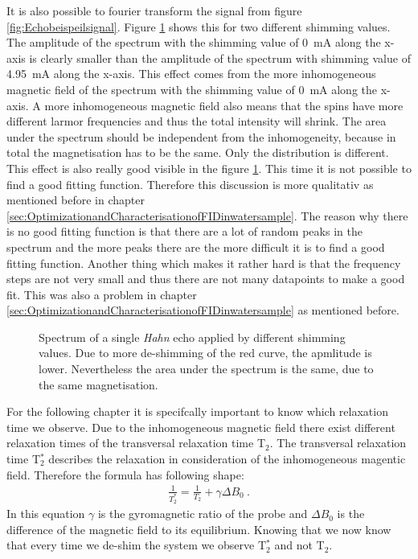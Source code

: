 It is also possible to fourier transform the signal from figure \ref{fig:Echobeispeilsignal}. Figure \ref{fig:SpinEcho} shows this for two different shimming values. The amplitude of the spectrum with the shimming value of \SI{0}{\milli \ampere} along the x-axis is clearly smaller than the amplitude of the spectrum with shimming value of \SI{4.95}{\milli \ampere} along the x-axis. This effect comes from the more inhomogeneous magnetic field of the spectrum with the shimming value of \SI{0}{\milli \ampere} along the x-axis. A more inhomogeneous magnetic field also means that the spins have more different larmor frequencies and thus the total intensity will shrink. The area under the spectrum should be independent from the inhomogeneity, because in total the magnetisation has to be the same. Only the distribution is different. This effect is also really good visible in the figure \ref{fig:SpinEcho}. This time it is not possible to find a good fitting function. Therefore this discussion is more qualitativ as mentioned before in chapter \ref{sec:OptimizationandCharacterisationofFIDinwatersample}. The reason why there is no good fitting function is that there are a lot of random peaks in the spectrum and the more peaks there are the more difficult it is to find a good fitting function. Another thing which makes it rather hard is that the frequency steps are not very small and thus there are not many datapoints to make a good fit. This was also a problem in chapter \ref{sec:OptimizationandCharacterisationofFIDinwatersample} as mentioned before.
\begin{figure}[H]
    \centering
    
    \caption[Spectrum of a single \textit{Hahn} echo applied by different shimming values.]{Spectrum of a single \textit{Hahn} echo applied by different shimming values. Due to more de-shimming of the red curve, the apmlitude is lower. Nevertheless the area under the spectrum is the same, due to the same magnetisation.}
    \label{fig:SpinEcho}
\end{figure}
For the following chapter it is specifcally important to know which relaxation time we observe. Due to the inhomogeneous magnetic field there exist different relaxation times of the transversal relaxation time T$_2$. The transversal relaxation time T$_2^*$ describes the relaxation in consideration of the inhomogeneous magentic field. Therefore the formula has following shape:
\begin{align}
    \frac{1}{T_2^*} = \frac{1}{T_2} + \gamma \Delta B_0 \ .
    \label{eq:T2_star}
\end{align}
In this equation $\gamma$ is the gyromagnetic ratio of the probe and $\Delta B_0$ is the difference of the magnetic field to its equilibrium. Knowing that we now know that every time we de-shim the system we observe T$_2^*$ and not T$_2$.
